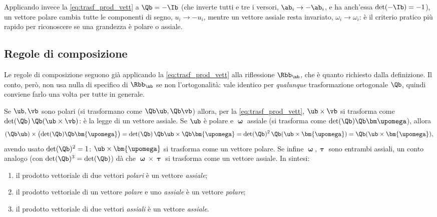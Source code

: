 




Applicando invece la \eqref{eq:trasf_prod_vett} a $\Qb=-\Ib$ (che
inverte tutti e tre i versori, $\ab_i\to-\ab_i$, e ha anch'essa
$\det(-\Ib)=-1$), un vettore polare cambia tutte le componenti di segno,
$u_i\to -u_i$, mentre un vettore assiale resta invariato,
$\omega_i\to\omega_i$: è il criterio pratico più rapido per riconoscere se
una grandezza è polare o assiale.

\subsection{Regole di composizione}
Le regole di composizione seguono già applicando la
\eqref{eq:trasf_prod_vett} alla riflessione $\Rbb_\nb$, che è quanto
richiesto dalla definizione. Il conto, però, non usa nulla di specifico
di $\Rbb_\nb$ se non l'ortogonalità: vale identico per \emph{qualunque}
trasformazione ortogonale $\Qb$, quindi conviene farlo una volta per
tutte in generale.

Se $\ub,\vb$ sono polari (si trasformano come $\Qb\ub,\Qb\vb$) allora, per
la \eqref{eq:trasf_prod_vett}, $\ub\times\vb$ si trasforma come
$\det(\Qb)\,\Qb(\ub\times\vb)$: è la legge di un vettore assiale. Se $\ub$
è polare e $\bm{\upomega}$ assiale (si trasforma come
$\det(\Qb)\Qb\bm\upomega$), allora
\begin{equation}
	(\Qb\ub)\times\bigl(\det(\Qb)\Qb\bm{\upomega}\bigr)
	=\det(\Qb)\,\Qb\ub\times\Qb\bm{\upomega}
	=\det(\Qb)^2\,\Qb(\ub\times\bm{\upomega})=\Qb(\ub\times\bm{\upomega}),
\end{equation}
avendo usato $\det(\Qb)^2=1$: $\ub\times\bm{\upomega}$ si trasforma come un
vettore polare. Se infine $\bm{\upomega},\bm\uptau$ sono entrambi assiali,
un conto analogo (con $\det(\Qb)^3=\det(\Qb)$) dà che
$\bm{\upomega}\times\bm\uptau$ si trasforma come un vettore assiale. In
sintesi:
\begin{enumerate}[label=(\roman*)]
	\item il prodotto vettoriale di due vettori \textit{polari} è un
	vettore \textit{assiale};
	\item il prodotto vettoriale di un vettore \textit{polare} e uno
	\textit{assiale} è un vettore \textit{polare};
	\item il prodotto vettoriale di due vettori \textit{assiali} è un
	vettore \textit{assiale}.
\end{enumerate}





